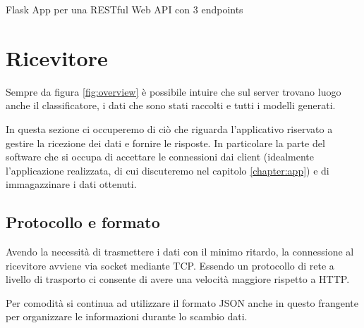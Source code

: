 \begin{listing}[H] 
    \inputminted[frame=single,framesep=10pt]{python}{assets/snippets/server/api/flask.py}
    \caption{Flask App per una RESTful Web API con 3 endpoints}
\end{listing}



\section{Ricevitore}
\label{section:receiver}
Sempre da figura \ref{fig:overview} è possibile intuire che sul server trovano luogo anche il classificatore, 
i dati che sono stati raccolti e tutti i modelli generati. 

In questa sezione ci occuperemo di ciò che riguarda l'applicativo riservato a gestire la ricezione dei dati e fornire le risposte. 
In particolare la parte del software che si occupa di accettare le connessioni dai client (idealmente l'applicazione realizzata, di cui 
discuteremo nel capitolo \ref{chapter:app}) e di immagazzinare i dati ottenuti.

\subsection{Protocollo e formato}
Avendo la necessità di trasmettere i dati con il minimo ritardo, la connessione al ricevitore avviene via socket mediante TCP.
Essendo un protocollo di rete a livello di trasporto ci consente di avere una velocità maggiore rispetto a HTTP. 

Per comodità si continua ad utilizzare il formato JSON anche in questo frangente per organizzare le informazioni durante lo scambio dati.


